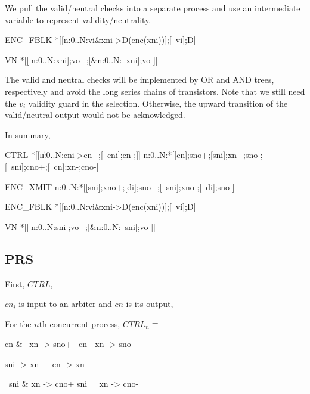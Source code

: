 \documentclass{article}
\begin{document}
We pull the valid/neutral checks into a separate process and use an intermediate variable to represent validity/neutrality.

\begin{hse}
ENC_FBLK\equiv
*[[\langle[]n:0..N:vi&xni->D(enc(xni))\Uparrow\rangle];[~vi];D\Downarrow]

VN\equiv
*[[\langle|n:0..N:xni\rangle];vo+;[\langle&n:0..N:~xni\rangle];vo-]]
\end{hse}

\noindent The valid and neutral checks will be implemented by OR and AND trees, respectively and avoid the long series chains of transistors. Note that we still need the $v_i$ validity guard in the selection. Otherwise, the upward transition of the valid/neutral output would not be acknowledged.

In summary,

\begin{hse}
CTRL\equiv
*[[\langle\|n:0..N:cni->cn+;[~cni];cn-;\rangle]] \pll
\langle\pll\!n:0..N:*[[cn];sno+;[sni];xn+;sno-;[~sni];cno+;[~cn];xn-;cno-]\rangle
\end{hse}

\begin{hse}
ENC_XMIT\equiv
\langle\pll\!n:0..N:*[[sni];xno+;[di];sno+;[~sni];xno-;[~di];sno-]\rangle
\end{hse}

\begin{hse}
ENC_FBLK\equiv
*[[\langle[]n:0..N:vi&xni->D(enc(xni))\Uparrow\rangle];[~vi];D\Downarrow]

VN\equiv
*[[\langle|n:0..N:sni\rangle];vo+;[\langle&n:0..N:~sni\rangle];vo-]]
\end{hse}

\subsection{PRS}

First, $CTRL$,

$cn_i$ is input to an arbiter and $cn$ is its output,

For the $n$th concurrent process, $CTRL_n\equiv$
\begin{prs2}
cn & ~xn -> sno+
~cn | xn -> sno-

sni -> xn+
~cn -> xn-

~sni & xn -> cno+
sni | ~xn -> cno-
\end{prs2}
\end{document}
